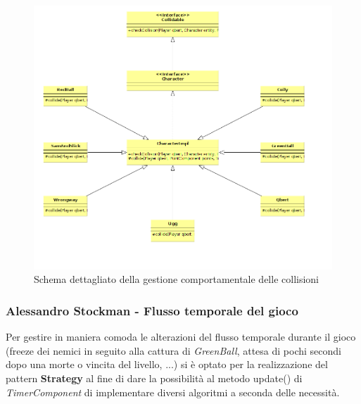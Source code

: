 \documentclass[a4paper,12pt, hidelinks]{report}
\begin{document}
\begin{figure}[H]
\centering{}
\includegraphics[width=\linewidth]{img/CheckCollision}
\caption{Schema dettagliato della gestione comportamentale delle collisioni}
\label{img:CheckCollision}
\end{figure}

\begin{flushright}
\item\subsubsection{Alessandro Stockman - Flusso temporale del gioco}
\end{flushright}

Per gestire in maniera comoda le alterazioni del flusso temporale durante il gioco (freeze dei nemici in seguito alla cattura di \emph{GreenBall}, attesa di pochi secondi dopo una morte o vincita del livello, ...) si è optato per la realizzazione del pattern \textbf{Strategy} al fine di dare la possibilità al metodo update() di \emph{TimerComponent} di implementare diversi algoritmi a seconda delle necessità.
\end{document}
